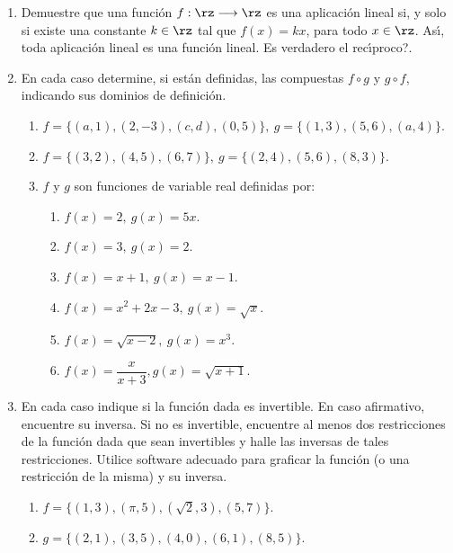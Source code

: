 \begin{enumerate}
\item Demuestre que una funci\'{o}n $f:\rz\longrightarrow\rz$ es una
aplicaci\'{o}n lineal si, y solo si existe una constante $k\in\rz$ tal que
$f(x)=kx$, para todo $x\in\rz$. As\'{\i}, toda aplicaci\'{o}n lineal es una
funci\'{o}n lineal. \textquestiondown Es verdadero el rec\'{\i}proco?.

\item En cada caso determine, si est\'{a}n definidas, las compuestas $f\circ
g$ y $g\circ f$, indicando sus dominios de definici\'{o}n.

\begin{enumerate}
\item $f=\{(a,1),(2,-3),(c,d),(0,5)\},\ g=\{(1,3),(5,6),(a,4)\}$.

\item $f=\{(3,2),(4,5),(6,7)\},\ g=\{(2,4),(5,6),(8,3)\}$.

\item $f$ y $g$ son funciones de variable real definidas por:

\begin{enumerate}
\item $f(x)=2,\ g(x)=5x$.

\item $f(x)=3,\ g(x)=2$.

\item $f(x)=x+1,\ g(x)=x-1$.

\item $f(x)=x^{2}+2x-3,\ g(x)=\sqrt{x}$.

\item $f(x)=\sqrt{x-2},\ g(x)=x^{3}$.

\item $f(x)=\dfrac{x}{x+3},g(x)=\sqrt{x+1}$.
\end{enumerate}
\end{enumerate}

\item En cada caso indique si la funci\'{o}n dada es invertible. En caso
afirmativo, encuentre su inversa. Si no es invertible, encuentre al menos dos
restricciones de la funci\'{o}n dada que sean invertibles y halle las inversas
de tales restricciones. Utilice software adecuado para graficar la funci\'{o}n
(o una restricci\'{o}n de la misma) y su inversa.

\begin{enumerate}
\item $f=\{(1,3),(\pi,5),(\sqrt{2},3),(5,7)\}$.

\item $g=\{(2,1),(3,5),(4,0),(6,1),(8,5)\}$.


\end{enumerate}
\end{enumerate}
